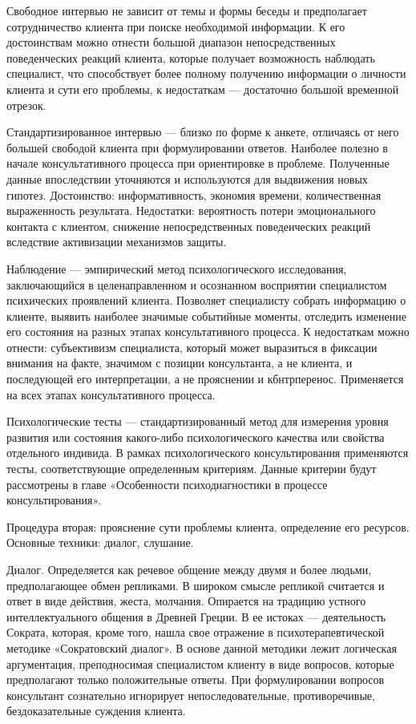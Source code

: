 \documentclass[a4paper, 12pt]{report}
\begin{document}
    Свободное интервью не зависит от темы и формы беседы и предполагает 
    сотрудничество клиента при поиске необходимой информации. К его 
    достоинствам можно отнести большой диапазон непосредственных 
    поведенческих реакций клиента, которые получает возможность наблюдать 
    специалист, что способствует более полному получению информации о 
    личности клиента и сути его проблемы, к недостаткам — достаточно 
    большой временной отрезок.
    
    Стандартизированное интервью — близко по форме к анкете, отличаясь 
    от него большей свободой клиента при формулировании ответов. 
    Наиболее полезно в начале консультативного процесса при ориентировке 
    в проблеме. Полученные данные впоследствии уточняются и используются 
    для выдвижения новых гипотез. Достоинство: информативность, экономия 
    времени, количественная выраженность результата. Недостатки: 
    вероятность потери эмоционального контакта с клиентом, снижение 
    непосредственных поведенческих реакций вследствие активизации 
    механизмов защиты.
      
    Наблюдение — эмпирический метод психологического исследования, 
    заключающийся в целенаправленном и осознанном восприятии специалистом 
    психических проявлений клиента. Позволяет специалисту собрать 
    информацию о клиенте, выявить наиболее значимые событийные моменты, 
    отследить изменение его состояния на разных этапах консультативного 
    процесса. К недостаткам можно отнести: субъективизм специалиста, 
    который может выразиться в фиксации внимания на факте, значимом с 
    позиции консультанта, а не клиента, и последующей его интерпретации, 
    а не прояснении и кбнтрперенос. Применяется на всех этапах 
    консультативного процесса.
    
    Психологические тесты — стандартизированный метод для измерения 
    уровня развития или состояния какого-либо психологического качества 
    или свойства отдельного индивида. В рамках психологического 
    консультирования применяются тесты, соответствующие определенным 
    критериям. Данные критерии будут рассмотрены в главе «Особенности 
    психодиагностики в процессе консультирования».
    
    Процедура вторая: прояснение сути проблемы клиента, определение его 
    ресурсов. Основные техники: диалог, слушание.
    
    Диалог. Определяется как речевое общение между двумя и более людьми, 
    предполагающее обмен репликами. В широком смысле репликой считается 
    и ответ в виде действия, жеста, молчания. Опирается на традицию 
    устного интеллектуального общения в Древней Греции. В ее истоках — 
    деятельность Сократа, которая, кроме того, нашла свое отражение в 
    психотерапевтической методике «Сократовский диалог». В основе 
    данной методики лежит логическая аргументация, преподносимая 
    специалистом клиенту в виде вопросов, которые предполагают только 
    положительные ответы. При формулировании вопросов консультант 
    сознательно игнорирует непоследовательные, противоречивые, 
    бездоказательные суждения клиента.
    
\end{document}
